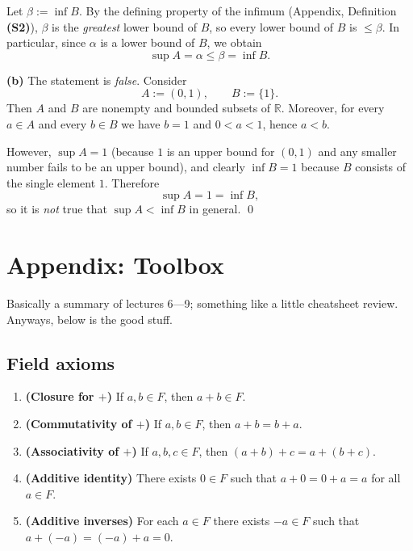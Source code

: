 \documentclass[12pt]{article}
\begin{document}
Let $\beta:=\inf B$. By the defining property of the infimum (Appendix, Definition \textbf{(S2)}), $\beta$ is the \emph{greatest} lower bound of $B$, so every lower bound of $B$ is $\le\beta$. In particular, since $\alpha$ is a lower bound of $B$, we obtain
\[
\sup A=\alpha\le \beta=\inf B.
\]

\medskip
\textbf{(b)} The statement is \emph{false}. Consider
\[
A:=(0,1),\qquad B:=\{1\}.
\]
Then $A$ and $B$ are nonempty and bounded subsets of $\mathbb{R}$. Moreover, for every $a\in A$ and every $b\in B$ we have $b=1$ and $0<a<1$, hence $a<b$.

However, $\sup A=1$ (because $1$ is an upper bound for $(0,1)$ and any smaller number fails to be an upper bound), and clearly $\inf B=1$ because $B$ consists of the single element $1$. Therefore
\[
\sup A=1=\inf B,
\]
so it is \emph{not} true that $\sup A<\inf B$ in general.
\qed

\newpage
\appendix
\section*{Appendix: Toolbox}
Basically a summary of lectures 6---9; something like a little cheatsheet review. Anyways, below is the good stuff.
\subsection*{Field axioms}
\begin{enumerate}[label=\textbf{(A\arabic*)}, leftmargin=3em, itemsep=0.25em]
\item \textbf{(Closure for $+$)} If $a,b\in F$, then $a+b\in F$.
\item \textbf{(Commutativity of $+$)} If $a,b\in F$, then $a+b=b+a$.
\item \textbf{(Associativity of $+$)} If $a,b,c\in F$, then $(a+b)+c=a+(b+c)$.
\item \textbf{(Additive identity)} There exists $0\in F$ such that $a+0=0+a=a$ for all $a\in F$.
\item \textbf{(Additive inverses)} For each $a\in F$ there exists $-a\in F$ such that
$a+(-a)=(-a)+a=0$.
\end{enumerate}
\end{document}
